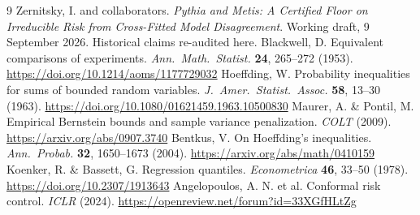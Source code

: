 \documentclass[11pt,a4paper]{article}
\begin{document}
\begingroup\small
\begin{thebibliography}{9}
 Zernitsky, I. and collaborators. \emph{Pythia and Metis: A Certified Floor on Irreducible Risk from Cross-Fitted Model Disagreement}. Working draft, 9 September 2026. Historical claims re-audited here.
 Blackwell, D. Equivalent comparisons of experiments. \emph{Ann.\ Math.\ Statist.} \textbf{24}, 265--272 (1953). \url{https://doi.org/10.1214/aoms/1177729032}
 Hoeffding, W. Probability inequalities for sums of bounded random variables. \emph{J.\ Amer.\ Statist.\ Assoc.} \textbf{58}, 13--30 (1963). \url{https://doi.org/10.1080/01621459.1963.10500830}
 Maurer, A. \& Pontil, M. Empirical Bernstein bounds and sample variance penalization. \emph{COLT} (2009). \url{https://arxiv.org/abs/0907.3740}
 Bentkus, V. On Hoeffding's inequalities. \emph{Ann.\ Probab.} \textbf{32}, 1650--1673 (2004). \url{https://arxiv.org/abs/math/0410159}
 Koenker, R. \& Bassett, G. Regression quantiles. \emph{Econometrica} \textbf{46}, 33--50 (1978). \url{https://doi.org/10.2307/1913643}
 Angelopoulos, A. N. et al. Conformal risk control. \emph{ICLR} (2024). \url{https://openreview.net/forum?id=33XGfHLtZg}
\end{thebibliography}
\endgroup
\end{document}
